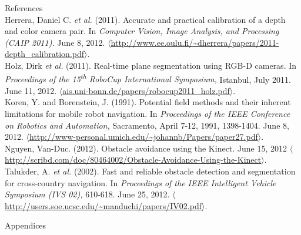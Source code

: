 \documentclass[12pt]{report}
\renewcommand{\Large}{\fontsize{18pt}{18pt}\selectfont}
\renewcommand{\large}{\fontsize{14pt}{14pt}\selectfont}
\begin{document}
\clearpage
{}
{}
{\large References} \\
\linebreak
Herrera, Daniel C. \textit{et al.} (2011). Accurate and practical calibration of a depth and color camera pair. In \textit{Computer Vision, Image Analysis, and Processing (CAIP 2011).} June 8, 2012. $\langle$\url{http://www.ee.oulu.fi/~dherrera/papers/2011-depth_calibration.pdf}$\rangle$.\\
Holz, Dirk \textit{et al.} (2011). Real-time plane segmentation using RGB-D cameras. In \textit{Proceedings of the 15\textsuperscript{th} RoboCup International Symposium,} Istanbul, July 2011. June 11, 2012. $\langle$\url{ais.uni-bonn.de/papers/robocup2011_holz.pdf}$\rangle$.\\
Koren, Y. and Borenstein, J. (1991). Potential field methods and their inherent limitations for mobile robot navigation. In \textit{Proceedings of the IEEE Conference on Robotics and Automation,} Sacramento, April 7-12, 1991, 1398-1404. June 8, 2012. $\langle$\url{http://www-personal.umich.edu/~johannb/Papers/paper27.pdf}$\rangle$.\\
Nguyen, Van-Duc. (2012). Obstacle avoidance using the Kinect. June 15, 2012 $\langle$\url{http://scribd.com/doc/80464002/Obstacle-Avoidance-Using-the-Kinect}$\rangle$.
Talukder, A. \textit{et al.} (2002). Fast and reliable obstacle detection and segmentation for cross-country navigation. In \textit{Proceedings of the IEEE Intelligent Vehicle Symposium (IVS 02),} 610-618. June 25, 2012. $\langle$\url{http://users.soe.ucsc.edu/~manduchi/papers/IV02.pdf}$\rangle$.

\clearpage
{\Large Appendices} \\
\appendix
\end{document}
